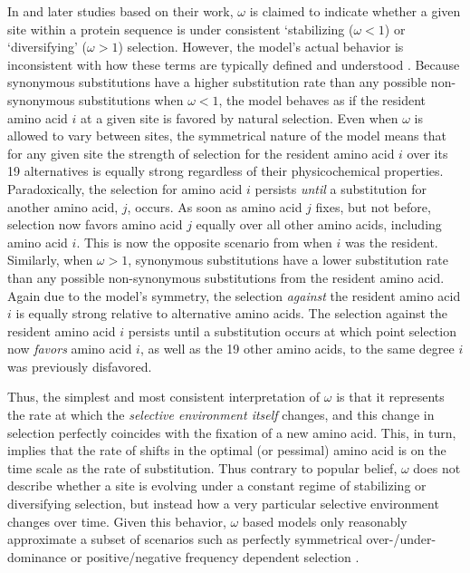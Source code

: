 \documentclass[12pt,letterpaper,fleqn]{article}
\newcommand{\PC}{physicochemical\xspace}
\begin{document}
In \citet{GoldmanAndYang1994,YangAndNielsen1998,NielsenAndYang1998} and later studies based on their work, $\omega$ is claimed to indicate whether a given site within a protein sequence is under consistent `stabilizing ($\omega < 1$) or `diversifying' ($\omega > 1$) selection.
However, the model's actual behavior is inconsistent with how these terms are typically defined and understood \citep[e.g.~see][]{Pellmyr2002}. %
Because synonymous substitutions have a higher substitution rate than any possible non-synonymous substitutions when $\omega < 1$, the model behaves as if the resident amino acid $i$ at a given site is favored by natural selection.
Even when $\omega$ is allowed to vary between sites, the symmetrical nature of the model means that for any given site the strength of selection for the resident amino acid $i$ over its 19 alternatives is equally strong regardless of their \PC properties.
Paradoxically, the selection for amino acid $i$ persists \emph{until} a substitution for another amino acid, $j$, occurs.
As soon as amino acid $j$ fixes, but not before, selection now favors amino acid $j$ equally over all other amino acids, including amino acid $i$.
This is now the opposite scenario from when $i$ was the resident.
Similarly, when $\omega > 1$, synonymous substitutions have a lower substitution rate than any possible non-synonymous substitutions from the resident amino acid.
Again due to the model's symmetry, the selection \emph{against} the resident amino acid $i$ is equally strong relative to alternative amino acids.
The selection against the resident amino acid $i$ persists until a substitution occurs at which point selection now \emph{favors} amino acid $i$, as well as the 19 other amino acids, to the same degree $i$ was previously disfavored.

Thus, the simplest and most consistent interpretation of $\omega$ is that it represents the rate at which the \emph{selective environment itself} changes, and this change in selection perfectly coincides with the fixation of a new amino acid.
This, in turn, implies that the rate of shifts in the optimal (or pessimal) amino acid is on the time scale as the rate of substitution.
Thus contrary to popular belief,  $\omega$ does not describe whether a site is evolving under a constant regime of stabilizing or diversifying selection, but instead how a very particular selective environment changes over time.
Given this behavior, $\omega$ based models only reasonably approximate a subset of scenarios such as perfectly symmetrical over-/under-dominance or positive/negative frequency dependent selection \citep{HughesAndNei1988,Nowak2006}.
\end{document}
